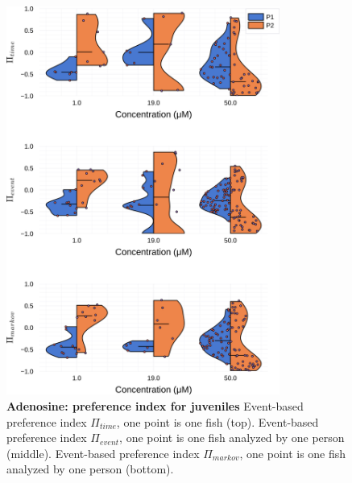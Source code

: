 \begin{appendices}
\begin{figure}[h]
      \includegraphics[width=0.8\textwidth]{part_2/assets/dist_adenosine.png}
      \caption{\textbf{Adenosine: preference index for juveniles} Event-based preference index $\Pi_{time}$, one point is one fish (top). Event-based preference index $\Pi_{event}$, one point is one fish analyzed by one person (middle). Event-based preference index $\Pi_{markov}$, one point is one fish analyzed by one person (bottom).}
      \label{dist_adenosine}
    \end{figure}
    \begin{figure}[h]
      \centering

\end{figure}
\end{appendices}
